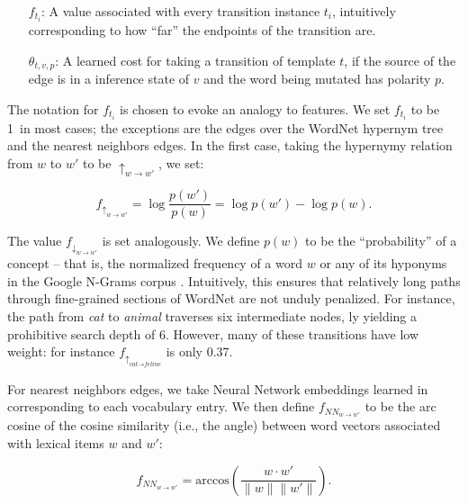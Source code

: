 \begin{itemize}
  \indentitem\item[$f_{t_i}$:]
    A value associated with every transition instance $t_i$, intuitively
      corresponding to how ``far'' the endpoints of the transition are.
  \indentitem\item[$\theta_{t,v,p}$:]
    A learned cost for taking a transition of template $t$, if the source
    of the edge is in a inference state of $v$ and the word being mutated
    has polarity $p$.
\end{itemize}

The notation for $f_{t_i}$ is chosen to evoke an analogy to features.
We set $f_{t_i}$ to be 1\ in most cases;
  the exceptions are the edges over the WordNet hypernym tree
  and the nearest neighbors edges.
In the first case, taking the hypernymy relation
  from $w$ to $w'$ to be $\uparrow_{w \rightarrow w'}$, we set:

\begin{equation*}
  f_{\uparrow_{w \rightarrow w'}}   = \log \frac{p(w')}{p(w)} = \log p(w') - \log p(w).
\end{equation*}

The value $f_{\downarrow_{w \rightarrow w'}}$ is set analogously.
We define $p(w)$ to be the ``probability'' of a concept --
  that is, the normalized frequency
  of a word $w$ or any of its hyponyms in the Google N-Grams corpus
  \cite{key:2006brants-ngrams}.
Intuitively, this ensures that relatively long paths through fine-grained
  sections of WordNet are not unduly penalized.
For instance, the path from \textit{cat} to \textit{animal} traverses
  six intermediate nodes, \naive ly yielding a prohibitive
  search depth of 6.
However, many of these transitions have low weight:
  for instance
  $f_{\uparrow_{\textit{cat} \rightarrow \textit{feline}}}$ is only
  \num{0.37}.

For nearest neighbors edges, we take Neural Network embeddings learned
  in  corresponding to each vocabulary entry.
We then define $f_{NN_{w \rightarrow w'}}$
  to be the arc cosine of the cosine similarity (i.e., the angle)
  between word vectors associated with lexical items $w$ and $w'$:

\begin{equation*}
  f_{NN_{w \rightarrow w'}}
    = \textrm{arccos} \left( \frac{w \cdot w'}{\|w\| \|w'\|} \right).
\end{equation*}

